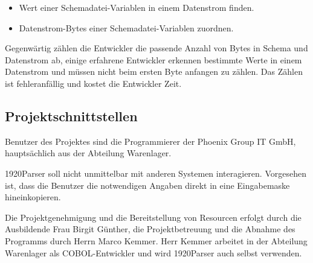 \begin{itemize}
\item Wert einer Schemadatei-Variablen in einem Datenstrom finden.
\item Datenstrom-Bytes einer Schemadatei-Variablen zuordnen.
\end{itemize}

Gegenwärtig zählen die Entwickler die passende Anzahl von Bytes in Schema und Datenstrom ab, einige erfahrene Entwickler erkennen bestimmte Werte in einem Datenstrom und müssen nicht beim ersten Byte anfangen zu zählen.
Das Zählen ist fehleranfällig und kostet die Entwickler Zeit. 


\subsection{Projektschnittstellen}
\label{sec:Projektschnittstellen}
Benutzer des Projektes sind die Programmierer der Phoenix Group IT GmbH, hauptsächlich aus der Abteilung Warenlager.

1920Parser soll nicht unmittelbar mit anderen Systemen interagieren. Vorgesehen ist, dass die Benutzer die notwendigen Angaben direkt in eine Eingabemaske hineinkopieren.

Die Projektgenehmigung und die Bereitstellung von Resourcen erfolgt durch die Ausbildende Frau Birgit Günther, die Projektbetreuung und die Abnahme des Programms durch Herrn Marco Kemmer. Herr Kemmer arbeitet in der Abteilung Warenlager als COBOL-Entwickler und wird 1920Parser auch selbst verwenden.

